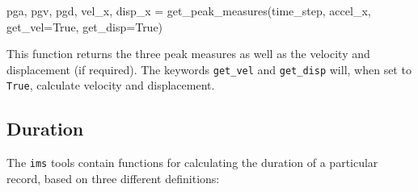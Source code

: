 \begin{python}[frame=single]
pga, pgv, pgd, vel_x, disp_x = get_peak_measures(time_step,
                                                 accel_x,
                                                 get_vel=True,
                                                 get_disp=True)
\end{python}

\noindent This function returns the three peak measures as well as the velocity and displacement (if required). The keywords \verb=get_vel= and \verb=get_disp= will, when set to \verb=True=, calculate velocity and displacement.

\subsection{Duration}

The \verb=ims= tools contain functions for calculating the duration of a particular record, based on three different definitions:

